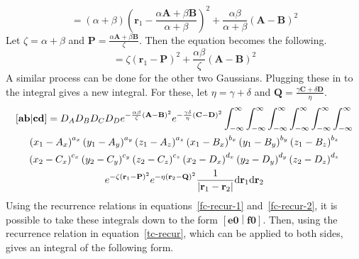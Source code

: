 \begin{equation}
  = \left(\alpha + \beta\right)\left(\mathbf{r}_1 - \frac{\alpha\mathbf{A} + \beta\mathbf{B}}{\alpha + \beta}\right)^2 + \frac{\alpha\beta}{\alpha + \beta} \left(\mathbf{A} - \mathbf{B}\right)^2
\end{equation}
Let $\zeta = \alpha + \beta$ and $\mathbf{P} = \frac{\alpha\mathbf{A} + \beta\mathbf{B}}{\zeta}$. Then the equation becomes the following.
\begin{equation}
  = \zeta\left(\mathbf{r}_1 - \mathbf{P}\right)^2 + \frac{\alpha\beta}{\zeta}\left(\mathbf{A} - \mathbf{B}\right)^2
\end{equation}
A similar process can be done for the other two Gaussians. Plugging these in to the integral gives a new integral. For these, let $\eta = \gamma + \delta$ and $\mathbf{Q} = \frac{\gamma\mathbf{C} + \delta\mathbf{D}}{\eta}$.
\begin{multline}
  \left[\mathbf{ab}\middle|\mathbf{cd}\right] = D_A D_B D_C D_D e^{-\frac{\alpha\beta}{\zeta}\left(\mathbf{A} - \mathbf{B}\right)^2} e^{-\frac{\gamma\delta}{\eta}\left(\mathbf{C} - \mathbf{D}\right)^2} \int_{-\infty}^\infty\int_{-\infty}^\infty\int_{-\infty}^\infty\int_{-\infty}^\infty\int_{-\infty}^\infty\int_{-\infty}^\infty\\
  \left(x_1 - A_x\right)^{a_x}\left(y_1 - A_y\right)^{a_y}\left(z_1 - A_z\right)^{a_z} \left(x_1 - B_x\right)^{b_x}\left(y_1 - B_y\right)^{b_y}\left(z_1 - B_z\right)^{b_z}\\
  \left(x_2 - C_x\right)^{c_x}\left(y_2 - C_y\right)^{c_y}\left(z_2 - C_z\right)^{c_z} \left(x_2 - D_x\right)^{d_x}\left(y_2 - D_y\right)^{d_y}\left(z_2 - D_z\right)^{d_z}\\
  e^{-\zeta\left(\mathbf{r}_1 - \mathbf{P}\right)^2} e^{-\eta\left(\mathbf{r}_2 - \mathbf{Q}\right)^2}\frac{1}{\left|\mathbf{r}_1 - \mathbf{r}_2\right|} \mathrm{d}\mathbf{r}_1 \mathrm{d}\mathbf{r}_2
\end{multline}
Using the recurrence relations in equations~\ref{fc-recur-1} and~\ref{fc-recur-2}, it is possible to take these integrals down to the form $\left[\mathbf{e0}\middle|\mathbf{f0}\right]$. Then, using the recurrence relation in equation~\ref{tc-recur}, which can be applied to both sides, gives an integral of the following form.
